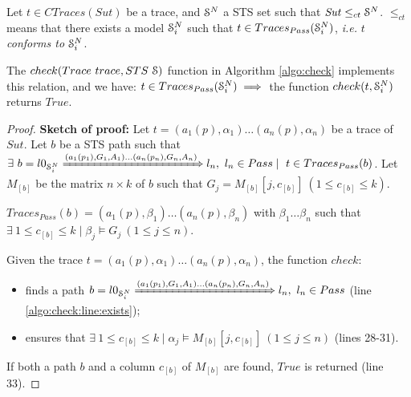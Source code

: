 \begin{proposition}
    Let $t \in CTraces(Sut)$ be a trace, and $\EuScript{S}^{N}$ a
    STS set such that $\mathit{Sut} \leq_{ct} \EuScript{S}^{N}$.
    $\leq_{ct}$ means that there exists a model
    $\EuScript{S}_i^{N}$ such that $t \in
    Traces_{Pass}(\EuScript{S}_i^{N})$, \emph{i.e.} $t$
    \emph{conforms to} $\EuScript{S}_i^{N}$.

    The $check(Trace ~trace, STS ~\EuScript{S})$ function in
    Algorithm \ref{algo:check} implements this relation, and we
    have: $t \in Traces_{Pass}(\EuScript{S}_i^{N}) \implies$ the
    function $check(t, \EuScript{S}_i^{N})$ returns $True$.

    \begin{proof}
        \textbf{Sketch of proof:} Let $t = (a_1(p), \alpha_1)
        \dots (a_n(p), \alpha_n)$ be a trace of $\mathit{Sut}$.
        Let $b$ be a STS path such that
        $\exists ~b=l0_{\EuScript{S}_i^{N}} \xRightarrow{(a_1(p_1),G_{1},A_{1}) \dots
        (a_n(p_n),G_{n},A_{n})} l_n, ~l_n \in Pass \mid ~t \in Traces_{Pass}(b)$.
        Let $M_{[b]}$ be the matrix $n \times k$ of $b$ such that
        $G_j = M_{[b]}[j, c_{[b]}] ~(1 \leq c_{[b]} \leq k)$.

        $Traces_{Pass}(b) = (a_1(p), \beta_1) \dots (a_n(p), \beta_n)$
        with $\beta_1 \dots \beta_n$ such that $\exists ~1 \leq
        c_{[b]} \leq k \mid \beta_j \models G_j ~(1 \leq j \leq n)$.

        Given the trace $t = (a_1(p), \alpha_1) \dots (a_n(p),
        \alpha_n)$, the function $check$:

        \begin{itemize}
            \item finds a path $b = l0_{\EuScript{S}_i^{N}}
                \xRightarrow{(a_1(p_1),G_{1},A_{1}) \dots
                (a_n(p_n),G_{n},A_{n})} l_n, ~l_n \in Pass$ (line
                \ref{algo:check:line:exists});

            \item ensures that $\exists ~1 \leq c_{[b]} \leq k
                \mid \alpha_j \models M_{[b]}[j, c_{[b]}] ~(1
                \leq j \leq n)$ (lines 28-31). %
        \end{itemize}

        If both a path $b$ and a column $c_{[b]}$ of $M_{[b]}$
        are found, $True$ is returned (line 33).
    \end{proof}

    \label{prop:check}
\end{proposition}

